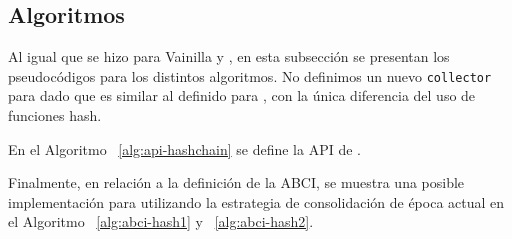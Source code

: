 
\subsection{Algoritmos}\label{subsubsec:details}

Al igual que se hizo para Vainilla y \compresschain, en esta subsección se presentan los pseudocódigos
para los distintos algoritmos. No definimos un nuevo \texttt{collector} para \hashchain dado que
es similar al definido
para \compresschain, con la única diferencia del uso de funciones hash.

En el Algoritmo ~\ref{alg:api-hashchain} se define la API de \setchain.




Finalmente, en relación a la definición de la ABCI, se muestra una posible implementación para
\hashchain utilizando la estrategia de consolidación de época actual en el Algoritmo ~\ref{alg:abci-hash1}
y ~\ref{alg:abci-hash2}.

